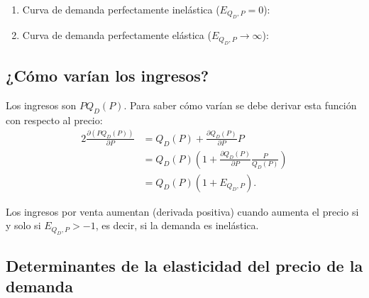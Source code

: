 \documentclass{report}
\begin{document}
\begin{enumerate}
\item Curva de demanda perfectamente inelástica ($E_{Q_D,P}=0$):
\begin{center}
\end{center}
\item Curva de demanda perfectamente elástica ($E_{Q_D,P}\to\infty$):
\begin{center}
\end{center}
\end{enumerate}

\subsection{¿Cómo varían los ingresos?}

Los ingresos son $PQ_D\!\left(P\right)$. Para saber cómo varían se debe derivar esta función con respecto al precio:
\begin{alignat*}{2}
\frac{\partial\left(PQ_D\!\left(P\right)\right)}{\partial P}&=Q_D\!\left(P\right)+\frac{\partial Q_D\!\left(P\right)}{\partial P}P \\
&=Q_D\!\left(P\right)\left(1+\frac{\partial Q_D\!\left(P\right)}{\partial P}\frac{P}{Q_D\!\left(P\right)}\right)\\
&=Q_D\!\left(P\right)\left(1+E_{Q_D,P}\right)\text{.}
\end{alignat*}

Los ingresos por venta aumentan (derivada positiva) cuando aumenta el precio si y solo si $E_{Q_D,P}>-1$, es decir, si la demanda es inelástica.

\subsection{Determinantes de la elasticidad del precio de la demanda}
\end{document}
